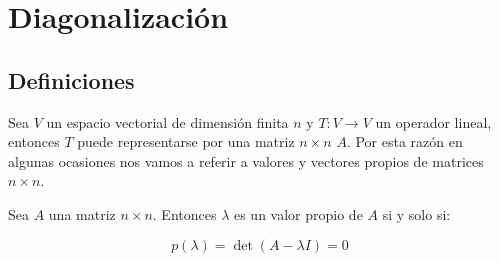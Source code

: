 \newpage
\section{Diagonalización}

	\subsection{Definiciones}

		\begin{definicion}
			Sea $V$ un espacio vectorial de dimensión finita $n$ y $T \colon V \to V$ un operador lineal, entonces $T$ puede representarse por una matriz $n \times n$ $A$.
			Por esta razón en algunas ocasiones nos vamos a referir a valores y vectores propios de matrices $n \times n$.
		\end{definicion}

		\begin{teorema}
			Sea $A$ una matriz $n \times n$. Entonces $\lambda$ es un valor propio de $A$ si y solo si:

			\begin{equation}
				p(\lambda) = \det{(A - \lambda I)} = 0
			\end{equation}
		\end{teorema}

